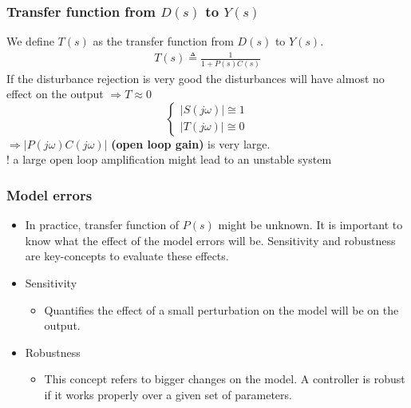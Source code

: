 \begin{frame}
	\frametitle{Transfer function from $D(s)$ to $Y(s)$}
	We define $T(s)$ as the transfer function from $D(s)$ to $Y(s)$.
	\begin{align*}
	T(s) \triangleq \frac{1}{1 + P(s)C(s)}
	\end{align*}
	If the disturbance rejection is very good the disturbances will have almost no effect on the output $\Rightarrow T \approx 0$ \\
	
	\[
	\begin{cases}
		\left| S(j\omega) \right| \cong 1 \\
		\left| T(j\omega) \right| \cong 0
	\end{cases}
	\]
	$\Rightarrow  \left| P(j\omega)C(j\omega) \right|$ \textbf{(open loop gain)} is very large. \\
	
	! a large open loop amplification might lead to an unstable system
	
\end{frame}

\begin{frame}
	\frametitle{Model errors}
	\begin{itemize}
		\item In practice, transfer function of $P(s)$ might be unknown. It is important to know what the effect of the model errors will be. Sensitivity and robustness are key-concepts to evaluate these effects.
		\item Sensitivity
		\begin{itemize}
			\item Quantifies the effect of a small perturbation on the model will be on the output. 
		\end{itemize}
		\item Robustness
		\begin{itemize}
			\item This concept refers to bigger changes on the model. A controller is robust if it works properly over a given set of parameters.
		\end{itemize}
	\end{itemize}
\end{frame}

